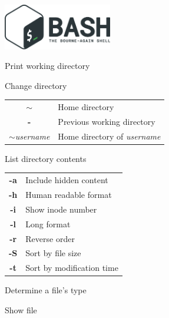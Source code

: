 \documentclass[12pt, a4paper]
{article}
\begin{document}
\pagestyle{empty}

\begin{center}
	 \hspace{1em}  \includegraphics[height=2cm]{bash_the_bourne_again_shell}
\end{center}
\vspace{0.25em}

\begin{multicols}{3}


\begin{description}[nolistsep]
	\item[pwd] Print working directory
	\item[cd] Change directory 
	\item
	\begin{tabular}{cl}
		{\large \ttfamily \textbf{$\sim$}} & Home directory \\
		{\large \ttfamily \textbf{-}} & Previous working directory \\
		{\large \ttfamily \textbf{$\sim$}\textit{username}} & Home directory of \textit{username}
	\end{tabular}
\end{description}


\begin{description}[nolistsep]
	\item[ls] List directory contents
	\item
	\begin{tabular}{cl}
		{\large \ttfamily \textbf{-a}} & Include hidden content \\
		{\large \ttfamily \textbf{-h}} & Human readable format\\
		{\large \ttfamily \textbf{-i}} & Show inode number\\
		{\large \ttfamily \textbf{-l}} & Long format \\
		{\large \ttfamily \textbf{-r}} & Reverse order \\
		{\large \ttfamily \textbf{-S}} & Sort by file size \\
		{\large \ttfamily \textbf{-t}} & Sort by modification time\\
	\end{tabular}
	\item[file] Determine a file's type
	\item[less] Show file
\end{description}


\end{multicols}
\end{document}
